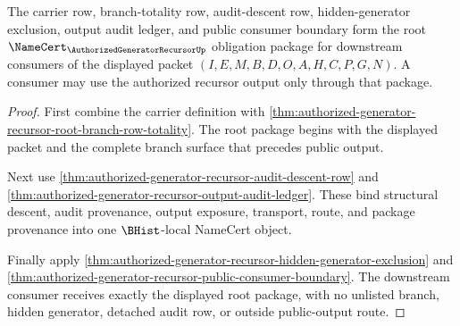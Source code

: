 \begin{theorem}
\label{thm:authorized-generator-recursor-namecert-root-unblock-package}
The carrier row, branch-totality row, audit-descent row, hidden-generator
exclusion, output audit ledger, and public consumer boundary form the root
$\NameCert_{\AuthorizedGeneratorRecursorUp}$ obligation package for downstream
consumers of the displayed packet
$(I,E,M,B,D,O,A,H,C,P,G,N)$. A consumer may use the authorized recursor output
only through that package.
\end{theorem}
\begin{proof}
First combine the carrier definition with
\autoref{thm:authorized-generator-recursor-root-branch-row-totality}. The root
package begins with the displayed packet and the complete branch surface that
precedes public output.

Next use \autoref{thm:authorized-generator-recursor-audit-descent-row} and
\autoref{thm:authorized-generator-recursor-output-audit-ledger}. These bind
structural descent, audit provenance, output exposure, transport, route, and
package provenance into one $\BHist$-local NameCert object.

Finally apply
\autoref{thm:authorized-generator-recursor-hidden-generator-exclusion} and
\autoref{thm:authorized-generator-recursor-public-consumer-boundary}. The
downstream consumer receives exactly the displayed root package, with no
unlisted branch, hidden generator, detached audit row, or outside public-output
route.
\end{proof}

